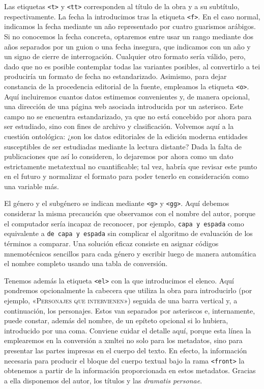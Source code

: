 Las etiquetas \texttt{<t>} y \texttt{<tt>} corresponden al título de la obra y a su subtítulo, respectivamente. La fecha la introducimos tras la etiqueta \texttt{<f>}. En el caso normal, indicamos la fecha mediante un año representado por cuatro guarismos arábigos. Si no conocemos la fecha concreta, optaremos entre usar un rango mediante dos años separados por un guion o una fecha insegura, que indicamos con un año y un signo de cierre de interrogación. Cualquier otro formato sería válido, pero, dado que no es posible contemplar todas las variantes posibles, al convertirlo a \ac{tei} produciría un formato de fecha no estandarizado. Asimismo, para dejar constancia de la procedencia editorial de la fuente, empleamos la etiqueta \texttt{<o>}. Aquí incluiremos cuantos datos estimemos convenientes y, de manera opcional, 
 una dirección de una página web asociada introducida por un asterisco. Este campo no se encuentra estandarizado, ya que no está concebido por ahora para ser estudiado, sino con fines de archivo y clasificación. Volvemos aquí a la cuestión ontológica: ¿son los datos editoriales de la edición moderna entidades susceptibles de ser estudiadas mediante la lectura distante? Dada la falta de publicaciones que así lo consideren, lo dejaremos por ahora como un dato estrictamente metatextual no cuantificable; tal vez, habría que revisar este punto en el futuro y normalizar el formato para poder tenerlo en consideración como una variable más. 

El género y el subgénero se indican mediante \texttt{<g>} y \texttt{<gg>}. Aquí debemos considerar la misma precaución que observamos con el nombre del autor, porque el computador sería incapaz de reconocer, por ejemplo, \texttt{capa y espada} como equivalente a \texttt{de capa y espada} sin complicar el algoritmo de evaluación de los términos a comparar. Una solución eficaz consiste en asignar códigos mnemotécnicos sencillos para cada género y escribir luego de manera automática el nombre completo usando una tabla de conversión.

Tenemos además la  etiqueta \texttt{<el>} con la que introducimos el elenco. Aquí pondremos opcionalmente la cabecera que utiliza la obra para introducirlo (por ejemplo, «\textsc{Personajes que intervienen}») seguida de una barra vertical y, a continuación, los personajes. Estos van separados por asteriscos e, internamente, puede constar, además del nombre, de un epíteto opcional si lo hubiera, introducido por una coma. Conviene cuidar el detalle aquí, porque esta línea la emplearemos en la conversión a \ac{xmltei} no solo para los metadatos, sino para presentar las partes impresas en el cuerpo del texto. En efecto, la información necesaria para producir el bloque del cuerpo textual bajo la rama \texttt{<front>} la obtenemos a partir de la información proporcionada en estos metadatos. Gracias a ella disponemos del autor, los títulos y las \textit{dramatis personae}.


